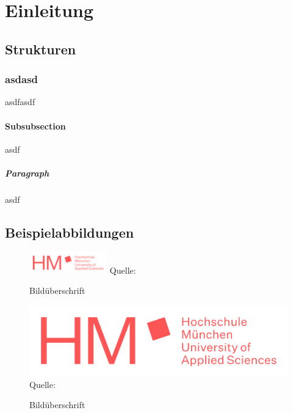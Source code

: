 \chapter{Einleitung}

\section{Strukturen}

\subsection{asdasd}
asdfasdf

\subsubsection{Subsubsection}
asdf

\paragraph{Paragraph}
asdf

\section{Beispielabbildungen}

\lipsum[10]

\begin{figure}
\caption{Bildüberschrift}
\centering
\includegraphics[width=0.3\textwidth]{content/pictures/hm}
Quelle: \cite{s11wasml}
\label{pic:bild2}
\end{figure}

\lipsum[10]

\begin{figure}
\caption{Bildüberschrift}
\includegraphics[width=1\textwidth]{content/pictures/hm}
Quelle: \cite{s11wasml}
\label{pic:bild1}
\end{figure}

